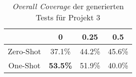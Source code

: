 \bgroup
\def\arraystretch{2}
\begin{table}[H]
	\vspace{.5cm}
	\centering		
	\begin{center}
		\begin{tabular}{|c||c|c|c|}
			\hline 
			& 0 & 0.25 & 0.5 \\
			\hline 
			\hline
			Zero-Shot & 37.1\% & 44.2\% & 45.6\% \\
			\hline
			One-Shot & \textbf{53.5\%} & 51.9\% & 40.0\% \\
			\hline
		\end{tabular} 
	\end{center}
	\caption{\textit{Overall Coverage} der generierten Tests für Projekt 3}
	\label{fig:o-3}
	\vspace{-.8cm}
\end{table}
\egroup